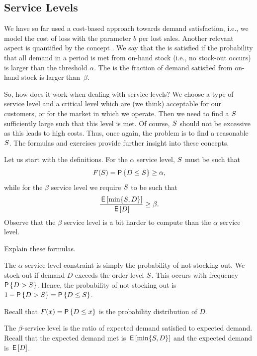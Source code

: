 \subsection{Service Levels}

We have so far used a cost-based approach towards demand satisfaction, i.e., we model the cost of loss with the parameter $b$ per lost sales. Another relevant aspect  is quantified by the concept . 
We say that the  is satisfied if the probability that all demand in a period is met from on-hand stock (i.e., no stock-out occurs) is larger than the threshold $\alpha$.  The  is the fraction of demand satisfied from on-hand stock is larger than~$\beta$. 

So, how does it work when dealing with service levels? We choose a type of service level and  a critical level which are (we think) acceptable for our customers, or for the market in which we operate. Then we need to find a $S$ sufficiently large such that this level is met. Of course, $S$ should not be excessive as this leads to high costs. Thus, once again, the problem is to find a reasonable $S$. The formulas and exercises provide further insight into these concepts.

Let us start with the definitions. For the $\alpha$ service level, $S$ must be such  that
\begin{equation}\label{eq:26}
  F(\Q) = \P{D\leq \Q} \geq \alpha,
\end{equation}
while for the  $\beta$ service level we require $S$ to be  such that
\begin{align}\label{eq:25}
\frac{\,\mathsf{E}\left[\min\{S, D\}\right]}{\,\mathsf{E}\left[D\right]} \geq \beta.
\end{align}
Observe that the $\beta$ service level is a bit harder to compute than the $\alpha$ service level.

\begin{exercise}
Explain these formulas.
\begin{solution}
The $\alpha$-service level constraint is simply the probability of not stocking out. We stock-out if demand $D$ exceeds the order level $S$. This occurs with frequency $\P{D> \Q}$. Hence, the probability of not stocking out is $1-\P{D>\Q} = \P{D\leq \Q}$. 

Recall that $F(x) = \P{D\leq x}$ is the probability distribution of $D$. 

The $\beta$-service level is the ratio of expected demand satisfied to expected demand. Recall that the expected demand met is $\,\mathsf{E}\left[\min\{S, D\}\right]$ and the expected demand is $\,\mathsf{E}\left[D\right]$. 
\end{solution}
\end{exercise}

